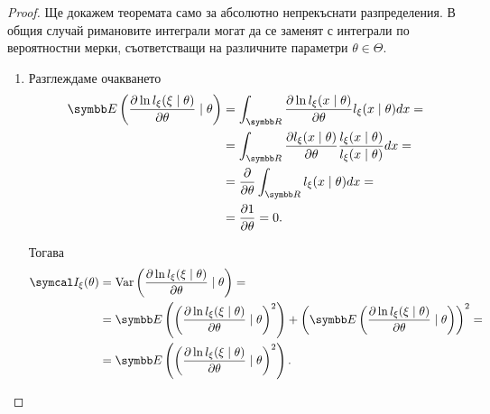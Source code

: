 \documentclass[
  numbers=endperiod,
  headings=standardclasses,
  bibliography=totocnumbered,
]{scrartcl}
\begin{document}
\begin{proof}
  Ще докажем теоремата само за абсолютно непрекъснати разпределения. В общия случай римановите интеграли могат да се заменят с интеграли по вероятностни мерки, съответстващи на различните параметри \( \theta \in \Theta \).
  \begin{enumerate}
    \item Разглеждаме очакването
    \begin{align*}
      \Expect\left( \frac {\partial \ln l_\xi(\xi \mid \theta)} {\partial \theta} \mid \theta \right)
      &=
      \int_{\R} \frac {\partial \ln l_\xi(x \mid \theta)} {\partial \theta} l_\xi(x \mid \theta) dx
      = \\ &=
      \int_{\R} \frac {\partial l_\xi(x \mid \theta)} {\partial \theta} \frac {l_\xi(x \mid \theta)} {l_\xi(x \mid \theta)} dx
      = \\ &=
      \frac \partial {\partial \theta} \int_{\R} l_\xi(x \mid \theta) dx
      = \\ &=
      \frac {\partial 1} {\partial \theta}
      =
      0.
    \end{align*}

    Тогава
    \begin{align*}
      \FisherInfo_\xi(\theta)
      &=
      \Var\left( \frac {\partial \ln l_\xi(\xi \mid \theta)} {\partial \theta} \mid \theta \right)
      = \\ &=
      \Expect\left( {\left( \frac {\partial \ln l_\xi(\xi \mid \theta)} {\partial \theta} \mid \theta \right)}^2 \right) + {\left(\Expect\left( \frac {\partial \ln l_\xi(\xi \mid \theta)} {\partial \theta} \mid \theta \right)\right)}^2
      = \\ &=
      \Expect\left( {\left( \frac {\partial \ln l_\xi(\xi \mid \theta)} {\partial \theta} \mid \theta \right)}^2 \right).
    \end{align*}


\end{enumerate}
\end{proof}
\end{document}
